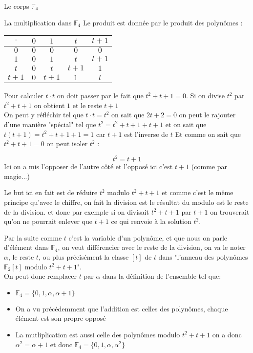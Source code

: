 \begin{parag}{Le corps $\mathbb{F}_4$}
\begin{subparag}{La multiplication dans $\mathbb{F}_4$}
        Le produit est donnée par le produit des polynômes :\\
                \begin{tabular}{|c||c|c|c|c|}
        \hline
            $\cdot$ & $0$ & $1$ & $t$ & $t+1$  \\
            \hline
            \hline
            $0$ & $0$ & $0$ & $0$ & $0$ \\
            \hline
            $1$ & $0$ & $1$ & $t$ & $t+1$ \\
            \hline
            $t$ & $0$ & $t$ & $t+1$ & $1$ \\
            \hline
            $t+1$ & $0$ & $t+1$ & $1$ & $t$ \\
            \hline
        \end{tabular}
        Pour calculer $t\cdot t$ on doit passer par le fait que $t^2 + t + 1 = 0$. Si on divise $t^2$ par $t^2 + t +1$ on obtient $1$ et le reste $t+1$
        \\
        On peut y réfléchir tel que $t\cdot t = t^2$ on sait que $2t + 2 = 0$ on peut le rajouter d'une manière "spécial" tel que $t^2 = t^2 + t + 1 + t + 1$ et on sait que $t(t+1) = t^2 + t + 1 + 1 = 1$ car $t+1$ est l'inverse de $t$ Et comme on sait que $t^2 + t + 1 = 0$ on peut isoler $t^2$ : 
        
        \[t^2 = t + 1\]
        Ici on a mis l'opposer de l'autre côté et l'opposé ici c'est $t+1$ (comme par magie...)
        \begin{framedremark}
            Le but ici en fait est de réduire $t^2$ modulo $t^2 + t + 1$ et comme c'est le même principe qu'avec le chiffre, on fait la division est le résultat du modulo est le reste de la division. et donc par exemple si on divisait $t^2 + t + 1$ par $t+1$ on trouverait qu'on ne pourrait enlever que $t+1$ ce qui renvoie à la solution $t^2$.
        \end{framedremark}
        Par la suite comme $t$ c'est la variable d'un polynôme, et que nous on parle d'élément dans $\mathbb{F}_4$, on veut différencier avec le reste de la division, on va le noter $\alpha$, le reste $t$, ou plus précisément la classe $[t]$ de $t$ dans "l'anneau des polynômes $\mathbb{F}_2[t]$ modulo $t^2 + t + 1$".
        \\
        On peut donc remplacer $t$ par $\alpha$ dans la définition de l'ensemble tel que:
        \begin{itemize}
            \item $\mathbb{F}_4 = \{0, 1, \alpha, \alpha + 1\}$
            \item On a vu précédemment que l'addition est celles des polynômes, chaque élément est son propre opposé
            \item La mutliplication est aussi celle des polynômes modulo $t^2 + t + 1$ on a donc $\alpha^2 = \alpha  + 1$ et donc $\mathbb{F}_4 = \{0, 1, \alpha, \alpha^2\}$

        \end{itemize}
    \end{subparag}
\end{parag}
